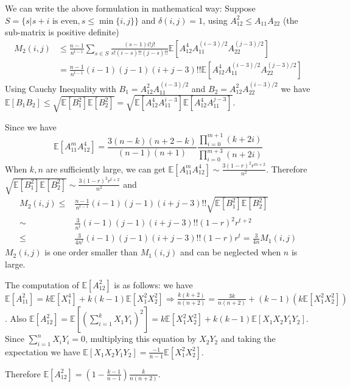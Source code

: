 \documentclass{article}
\def\E{\mathbb{E}}
\begin{document}
We can write the above formulation in mathematical way:
Suppose $S=\{s| s+i \textrm{ is even}, s\leq \min\{i,j\} \}$ and $\delta(i, j)= 1$,
using $A_{12}^2 \leq A_{11}A_{22}$ (the sub-matrix is positive definite)
\begin{align*}
M_2(i, j) & \leq \frac{n-1}{n^{t-1}} \sum_{s \in S}
\frac{(s-1)i!j!}{s!(i-s)!!(j-s)!!}
\E[A_{12}^4 A_{11}^{(i - 3) /2}A_{22}^{(j - 3)/2}]\\
&= \frac{n-1}{n^{t-1}} (i-1)(j-1)(i+j-3)!!
\E[A_{12}^4 A_{11}^{(i - 3) /2}A_{22}^{(j - 3)/2}]
\end{align*}
Using Cauchy Inequality with $B_1 = A_{12}^2 A_{11}^{(i-3)/2}$ and $B_2 = A_{12}^2 A_{22}^{(i-3)/2}$ we have $\E[B_1B_2] \leq \sqrt{\E[B_1^2] \E[B_2^2]} =\sqrt{\E[ A_{12}^4 A_{11}^{i-3} ]\E[ A_{12}^4 A_{11}^{j-3} ]}$.

Since we have 
\begin{equation}\label{eq:Am4}
\E[A_{11}^m A_{12}^4] = \frac{3(n-k)(n+2-k)}{(n-1)(n+1)} \frac{\prod_{i=0}^{m+1} (k+2i)}{\prod_{i=0}^{m+3} (n+2i)}
\end{equation}
When $k, n$ are sufficiently large, we can get $\E[A_{11}^m A_{12}^4] \sim \frac{3(1-r)^2 r^{m+2}}{n^2}$. Therefore
$ \sqrt{\E[B_1^2] \E[B_2^2]}  \sim  \frac{3(1-r)^2 r^{t+2}}{n^2}$ and 
\begin{align*}
M_2(i, j) \leq & \frac{n-1}{n^{t-1}} (i-1)(j-1)(i+j-3)!! 
\sqrt{\E[B_1^2] \E[B_2^2]} \\
\sim & \frac{3}{n^t} (i-1)(j-1)(i+j-3)!!
(1-r)^2 r^{t+2} \\
\leq & \frac{3}{4n^t} (i-1)(j-1)(i+j-3)!! (1-r)r^t = \frac{3}{4n} M_1(i,j)
\end{align*}
$M_2(i,j)$ is one order smaller than $M_1(i,j)$ and can be neglected when $n$ is large. 

The computation of $\E[A^2_{12}]$ is as follows:
we have $\E[A_{11}^2] = k\E[X_1^4] + k(k-1)\E[X_1^2 X_2^2] \Rightarrow
\frac{k(k+2)}{n(n+2)} = \frac{3k}{n(n+2)} + (k-1) (k \E[X_1^2 X_2^2])$.
Also $\E[A_{12}^2] = \E[(\sum_{i=1}^k X_1 Y_1)^2]
= k \E[X_1^2X^2_2] + k(k-1)\E[X_1X_2Y_1Y_2]
$.
Since $\sum_{i=1}^n X_i Y_i = 0$, multiplying this equation by $X_2Y_2$ and taking the expectation
we have $\E[X_1X_2Y_1Y_2] = \frac{-1}{n-1} \E[X_1^2 X_2^2]$.

Therefore $\E[A^2_{12}]=(1-\frac{k-1}{n-1}) \frac{k}{n(n+2)}$.
\end{document}
